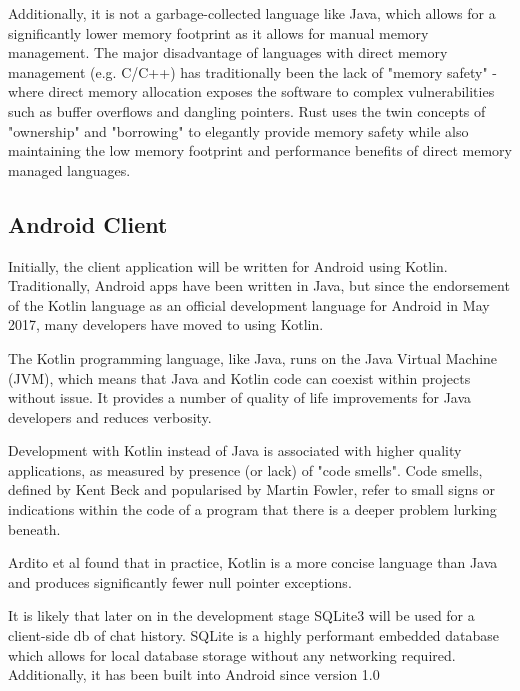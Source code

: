 \documentclass{mproj}
\begin{document}
Additionally, it is not a garbage-collected language\cite{jones1996garbage} like Java, which allows for a significantly lower memory footprint as it allows for manual memory management. The major disadvantage of languages with direct memory management (e.g. C/C++) has traditionally been the lack of "memory safety"\cite{de2018meaning} - where direct memory allocation exposes the software to complex vulnerabilities such as buffer overflows and dangling pointers. Rust uses the twin concepts of "ownership" and "borrowing" \cite{levy2015ownership} to elegantly provide memory safety while also maintaining the low memory footprint and performance benefits of direct memory managed languages.


\subsection{Android Client}
Initially, the client application will be written for Android using Kotlin. Traditionally, Android apps have been written in Java\cite{murphy2008busy}, but since the endorsement of the Kotlin language as an official development language for Android in May 2017\cite{ardito2020effectiveness}, many developers have moved to using Kotlin.

The Kotlin programming language, like Java, runs on the Java Virtual Machine (JVM), which means that Java and Kotlin code can coexist within projects without issue. It provides a number of quality of life improvements for Java developers and reduces verbosity.

Development with Kotlin instead of Java is associated with higher quality applications\cite{mateus2019empirical}, as measured by presence (or lack) of "code smells". Code smells, defined by  Kent Beck and popularised by Martin Fowler\cite{beck1999bad}, refer to small signs or indications within the code of a program that there is a deeper problem lurking beneath.

Ardito et al found that in practice, Kotlin is a more concise language than Java and produces significantly fewer null pointer exceptions\cite{ardito2020effectiveness}.

It is likely that later on in the development stage SQLite3\cite{owens2010sqlite} will be used for a client-side db of chat history. SQLite is a highly performant embedded database which allows for local database storage without any networking required. Additionally, it has been built into Android since version 1.0 \cite{aditya2014android}   
\end{document}
